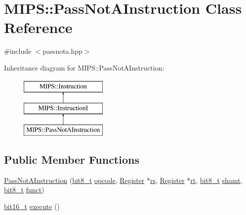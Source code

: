 \hypertarget{classMIPS_1_1PassNotAInstruction}{}\section{M\+I\+PS\+:\+:Pass\+Not\+A\+Instruction Class Reference}
\label{classMIPS_1_1PassNotAInstruction}


{\ttfamily \#include $<$passnota.\+hpp$>$}

Inheritance diagram for M\+I\+PS\+:\+:Pass\+Not\+A\+Instruction\+:\begin{figure}[H]
\begin{center}
\leavevmode
\includegraphics[height=3.000000cm]{classMIPS_1_1PassNotAInstruction}
\end{center}
\end{figure}
\subsection*{Public Member Functions}
\begin{DoxyCompactItemize}
\item 
\hyperlink{classMIPS_1_1PassNotAInstruction_a4e68ad0b8200cd75f2b08346e7b2031a}{Pass\+Not\+A\+Instruction} (\hyperlink{core_8hpp_a6074bae122ae7b527864eec42c728c3c}{bit8\+\_\+t} \hyperlink{classMIPS_1_1Instruction_a45cc6808b5dde8a5d41067d148b55476}{opcode}, \hyperlink{classMIPS_1_1Register}{Register} $\ast$\hyperlink{classMIPS_1_1InstructionI_a2be191d5b3dce505e2e626ec02eb4d62}{rs}, \hyperlink{classMIPS_1_1Register}{Register} $\ast$\hyperlink{classMIPS_1_1InstructionI_add1db07a5c954f35271de8c8a5737487}{rt}, \hyperlink{core_8hpp_a6074bae122ae7b527864eec42c728c3c}{bit8\+\_\+t} \hyperlink{classMIPS_1_1InstructionI_aa9b6da37c374c2ec8d96448d341e5e7d}{shamt}, \hyperlink{core_8hpp_a6074bae122ae7b527864eec42c728c3c}{bit8\+\_\+t} \hyperlink{classMIPS_1_1InstructionI_a5c6efcbbd233a7447c1fe24ea0a1e558}{funct})
\item 
\hyperlink{core_8hpp_adc265a970bc35995b5879784bbb3f1b7}{bit16\+\_\+t} \hyperlink{classMIPS_1_1PassNotAInstruction_a30b9bdb1feac1adb44e70a3a0eb85cb4}{execute} ()
\end{DoxyCompactItemize}
